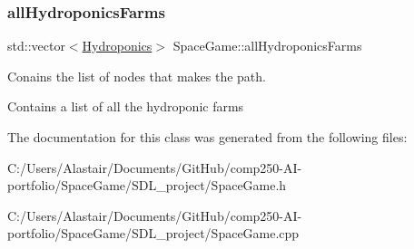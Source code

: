 \subsubsection{\texorpdfstring{all\+Hydroponics\+Farms}{allHydroponicsFarms}}
{\footnotesize\ttfamily std\+::vector$<$\hyperlink{class_hydroponics}{Hydroponics}$>$ Space\+Game\+::all\+Hydroponics\+Farms}



Conains the list of nodes that makes the path. 

Contains a list of all the hydroponic farms 

The documentation for this class was generated from the following files\+:\begin{DoxyCompactItemize}
\item 
C\+:/\+Users/\+Alastair/\+Documents/\+Git\+Hub/comp250-\/\+A\+I-\/portfolio/\+Space\+Game/\+S\+D\+L\+\_\+project/Space\+Game.\+h\item 
C\+:/\+Users/\+Alastair/\+Documents/\+Git\+Hub/comp250-\/\+A\+I-\/portfolio/\+Space\+Game/\+S\+D\+L\+\_\+project/Space\+Game.\+cpp\end{DoxyCompactItemize}
